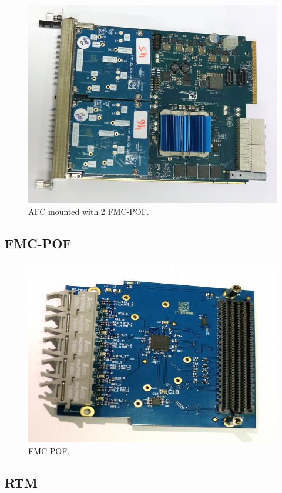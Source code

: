 \documentclass[a4paper,
               biblatex,      %
               ]{jacow}
\begin{document}
\begin{figure}[!htb]
   \centering
   \includegraphics*[width=0.8\columnwidth]{AFC_POFs_resized}
   \caption{AFC mounted with 2 FMC-POF.}
   \label{fig:afc_pofs}
\end{figure}

\subsection{FMC-POF}
\cite{fmc-pof-git}

\begin{figure}[!htb]
   \centering
   \includegraphics*[width=0.5\columnwidth]{FMC_POF_resized}
   \caption{FMC-POF.}
   \label{fig:fmc_pof}
\end{figure}

\subsection{RTM}
\cite{rtm-sfp-git}
\end{document}
